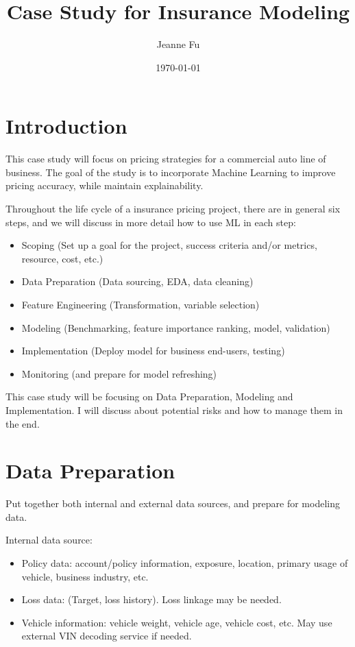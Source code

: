 \documentclass{article}
\title{Case Study for Insurance Modeling}
\author{Jeanne Fu}
\date{\today}
\begin{document}
\maketitle

\section{Introduction}
This case study will focus on pricing strategies for a commercial auto line of business. The goal of the study is to incorporate Machine Learning to improve pricing accuracy, while maintain explainability.

Throughout the life cycle of a insurance pricing project, there are in general six steps, and we will discuss in more detail how to use ML in each step:

\begin{itemize}
    \item Scoping (Set up a goal for the project, success criteria and/or metrics, resource, cost, etc.)
    \item Data Preparation (Data sourcing, EDA, data cleaning)
    \item Feature Engineering (Transformation, variable selection)
    \item Modeling (Benchmarking, feature importance ranking, model, validation)
    \item Implementation (Deploy model for business end-users, testing)
    \item Monitoring (and prepare for model refreshing)
\end{itemize}

This case study will be focusing on Data Preparation, Modeling and Implementation. I will discuss about potential risks and how to manage them in the end.

\section{Data Preparation}
Put together both internal and external data sources, and prepare for modeling data.

Internal data source:
\begin{itemize}
    \item Policy data: account/policy information, exposure, location, primary usage of vehicle, business industry, etc.
    \item Loss data: (Target, loss history). Loss linkage may be needed. 
    \item Vehicle information: vehicle weight, vehicle age, vehicle cost, etc. May use external VIN decoding service if needed.
\end{itemize}
\end{document}
